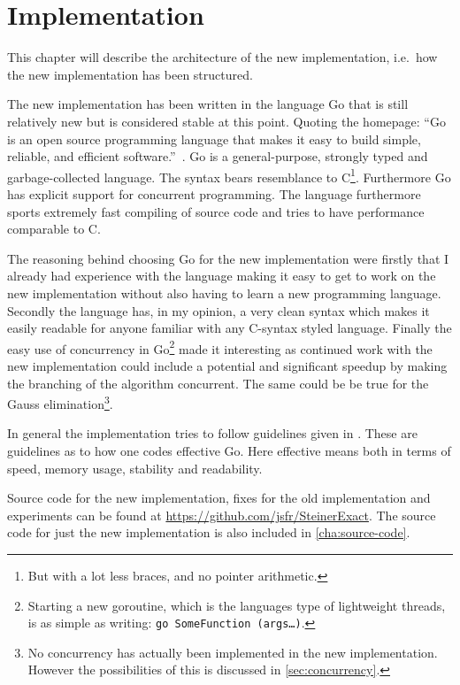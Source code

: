  {
\abnormalparskip{0pt}
\chapter{Implementation}
\label{cha:implementation}
}

This chapter will describe the architecture of the new implementation, i.e.\ how
the new implementation has been structured.

The new implementation has been written in the language Go that is still
relatively new but is considered stable at this point. Quoting the homepage:
``Go is an open source programming language that makes it easy to build simple,
reliable, and efficient software.''~\cite{golanghomepage}. Go is a
general-purpose, strongly typed and garbage-collected language. The syntax bears
resemblance to C\footnote{But with a lot less braces, and no pointer
  arithmetic.}. Furthermore Go has explicit support for concurrent programming.
The language furthermore sports extremely fast compiling of source code and
tries to have performance comparable to C.

The reasoning behind choosing Go for the new implementation were firstly that I
already had experience with the language making it easy to get to work on the
new implementation without also having to learn a new programming language.
Secondly the language has, in my opinion, a very clean syntax which makes it
easily readable for anyone familiar with any C-syntax styled language. Finally
the easy use of concurrency in Go\footnote{Starting a new goroutine, which is
  the languages type of lightweight threads, is as simple as writing:
  \texttt{go~SomeFunction~(args\ldots)}.} made it interesting as continued work
with the new implementation could include a potential and significant speedup by
making the branching of the algorithm concurrent. The same could be be true for
the Gauss elimination\footnote{No concurrency has actually been implemented in
  the new implementation. However the possibilities of this is discussed in
  \cref{sec:concurrency}.}.

In general the implementation tries to follow guidelines given in
\textcite{effectivego}. These are guidelines as to how one codes effective
Go. Here effective means both in terms of speed, memory usage, stability and
readability.

Source code for the new implementation, fixes for the old implementation and
experiments can be found at \url{https://github.com/jsfr/SteinerExact}. The
source code for just the new implementation is also included in
\cref{cha:source-code}.

